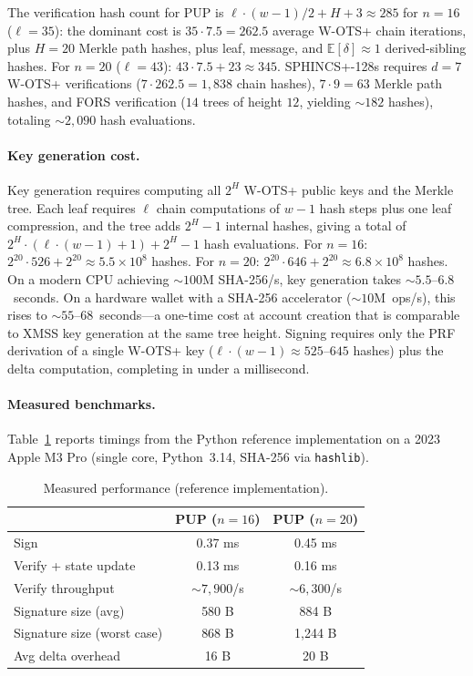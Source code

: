 \documentclass[11pt]{article}
\begin{document}
The verification hash count for PUP is $\ell \cdot (w - 1) / 2 + H + 3
\approx 285$ for $n = 16$ ($\ell = 35$): the dominant cost is $35
\cdot 7.5 = 262.5$ average W-OTS+ chain iterations, plus $H = 20$
Merkle path hashes, plus leaf, message, and $\mathbb{E}[\delta] \approx
1$ derived-sibling hashes. For $n = 20$ ($\ell = 43$): $43 \cdot 7.5 +
23 \approx 345$. SPHINCS+-128s requires $d = 7$ W-OTS+ verifications
($7 \cdot 262.5 = 1{,}838$ chain hashes), $7 \cdot 9 = 63$ Merkle path
hashes, and FORS verification ($14$ trees of height $12$, yielding
${\sim}182$ hashes), totaling ${\sim}2{,}090$ hash evaluations.

\paragraph{Key generation cost.}
Key generation requires computing all $2^H$ W-OTS+ public keys and the
Merkle tree. Each leaf requires $\ell$ chain computations of $w - 1$
hash steps plus one leaf compression, and the tree adds $2^H - 1$
internal hashes, giving a total of
$2^H \cdot (\ell \cdot (w - 1) + 1) + 2^H - 1$ hash evaluations.
For $n = 16$: $2^{20} \cdot 526 + 2^{20} \approx 5.5 \times 10^8$
hashes. For $n = 20$: $2^{20} \cdot 646 + 2^{20} \approx 6.8 \times
10^8$ hashes. On a modern CPU achieving ${\sim}100$M SHA-256/s, key
generation takes ${\sim}5.5$--$6.8$~seconds. On a hardware wallet with
a SHA-256 accelerator (${\sim}10$M~ops/s), this rises to
${\sim}55$--$68$~seconds---a one-time cost at account creation that is
comparable to XMSS key generation at the same tree height. Signing
requires only the PRF derivation of a single W-OTS+ key ($\ell \cdot
(w - 1) \approx 525$--$645$ hashes) plus the delta computation,
completing in under a millisecond.

\paragraph{Measured benchmarks.}
Table~\ref{tab:bench} reports timings from the Python reference
implementation on a 2023 Apple M3 Pro (single core, Python~3.14,
SHA-256 via \texttt{hashlib}).

\begin{table}[h]
\centering
\caption{Measured performance (reference implementation).}\label{tab:bench}
\begin{tabular}{lcc}
\toprule
 & PUP ($n{=}16$) & PUP ($n{=}20$) \\
\midrule
Sign & 0.37 ms & 0.45 ms \\
Verify + state update & 0.13 ms & 0.16 ms \\
Verify throughput & ${\sim}7{,}900$/s & ${\sim}6{,}300$/s \\
Signature size (avg) & 580 B & 884 B \\
Signature size (worst case) & 868 B & 1{,}244 B \\
Avg delta overhead & 16 B & 20 B \\
\bottomrule
\end{tabular}
\end{table}
\end{document}

